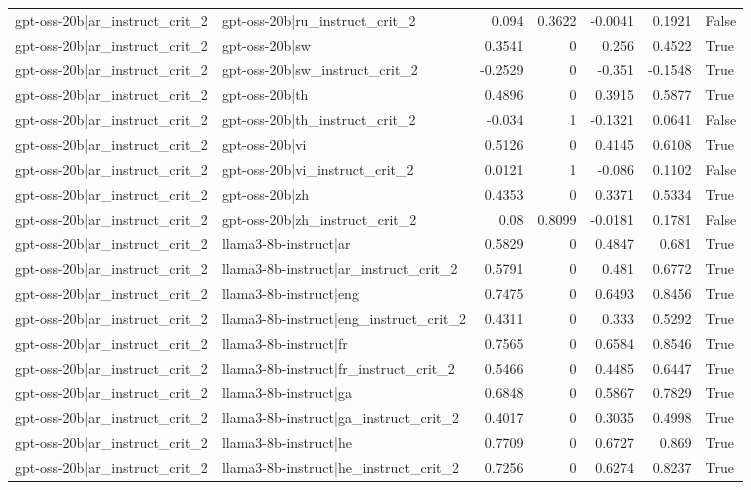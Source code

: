 \begin{table}
\begin{tabular}{l l r r r r l}
gpt-oss-20b|ar_instruct_crit_2 & gpt-oss-20b|ru_instruct_crit_2 & 0.094 & 0.3622 & -0.0041 & 0.1921 & False \\
gpt-oss-20b|ar_instruct_crit_2 & gpt-oss-20b|sw & 0.3541 & 0 & 0.256 & 0.4522 & True \\
gpt-oss-20b|ar_instruct_crit_2 & gpt-oss-20b|sw_instruct_crit_2 & -0.2529 & 0 & -0.351 & -0.1548 & True \\
gpt-oss-20b|ar_instruct_crit_2 & gpt-oss-20b|th & 0.4896 & 0 & 0.3915 & 0.5877 & True \\
gpt-oss-20b|ar_instruct_crit_2 & gpt-oss-20b|th_instruct_crit_2 & -0.034 & 1 & -0.1321 & 0.0641 & False \\
gpt-oss-20b|ar_instruct_crit_2 & gpt-oss-20b|vi & 0.5126 & 0 & 0.4145 & 0.6108 & True \\
gpt-oss-20b|ar_instruct_crit_2 & gpt-oss-20b|vi_instruct_crit_2 & 0.0121 & 1 & -0.086 & 0.1102 & False \\
gpt-oss-20b|ar_instruct_crit_2 & gpt-oss-20b|zh & 0.4353 & 0 & 0.3371 & 0.5334 & True \\
gpt-oss-20b|ar_instruct_crit_2 & gpt-oss-20b|zh_instruct_crit_2 & 0.08 & 0.8099 & -0.0181 & 0.1781 & False \\
gpt-oss-20b|ar_instruct_crit_2 & llama3-8b-instruct|ar & 0.5829 & 0 & 0.4847 & 0.681 & True \\
gpt-oss-20b|ar_instruct_crit_2 & llama3-8b-instruct|ar_instruct_crit_2 & 0.5791 & 0 & 0.481 & 0.6772 & True \\
gpt-oss-20b|ar_instruct_crit_2 & llama3-8b-instruct|eng & 0.7475 & 0 & 0.6493 & 0.8456 & True \\
gpt-oss-20b|ar_instruct_crit_2 & llama3-8b-instruct|eng_instruct_crit_2 & 0.4311 & 0 & 0.333 & 0.5292 & True \\
gpt-oss-20b|ar_instruct_crit_2 & llama3-8b-instruct|fr & 0.7565 & 0 & 0.6584 & 0.8546 & True \\
gpt-oss-20b|ar_instruct_crit_2 & llama3-8b-instruct|fr_instruct_crit_2 & 0.5466 & 0 & 0.4485 & 0.6447 & True \\
gpt-oss-20b|ar_instruct_crit_2 & llama3-8b-instruct|ga & 0.6848 & 0 & 0.5867 & 0.7829 & True \\
gpt-oss-20b|ar_instruct_crit_2 & llama3-8b-instruct|ga_instruct_crit_2 & 0.4017 & 0 & 0.3035 & 0.4998 & True \\
gpt-oss-20b|ar_instruct_crit_2 & llama3-8b-instruct|he & 0.7709 & 0 & 0.6727 & 0.869 & True \\
gpt-oss-20b|ar_instruct_crit_2 & llama3-8b-instruct|he_instruct_crit_2 & 0.7256 & 0 & 0.6274 & 0.8237 & True \\

\end{tabular}
\end{table}
